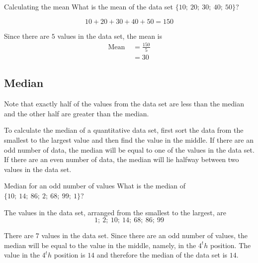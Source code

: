 \begin{wex}{Calculating the mean}{
    What is the mean of the data set $\{10;\ 20;\ 30;\ 40;\ 50\}$?
}{
  \begin{equation*}
    10 + 20 + 30 + 40 + 50 = 150
  \end{equation*}


  Since there are $5$ values in the data set, the mean is
  \begin{align*}
    \mbox{Mean }&=\frac{150}{5} \\
&= 30
  \end{align*}
}
\end{wex}

\subsection{Median}

Note that exactly half of the values from the data set are less than
  the median and the other half are greater than the median.\par

To calculate the median of a quantitative data set, first sort the
data from the smallest to the largest value and then find the value in
the middle. If there are an odd number of data, the median will be
equal to one of the values in the data set. If there are an even
number of data, the median will lie halfway between two values in
the data set.

\begin{wex}{Median for an odd number of values}{
  What is the median of $\{10;\ 14;\ 86;\ 2;\ 68;\ 99;\ 1\}$?
}{

  The values in the data set, arranged from the smallest to the largest, are
  \begin{equation*}
    1;\ 2;\ 10;\ 14;\ 68;\ 86;\ 99
  \end{equation*}


  There are $7$ values in the data set. Since there are an odd number
  of values, the median will be equal to the value in the middle,
  namely, in the $4^th$ position. The value in the $4^th$ position is
  $14$ and therefore the median of the data set is $14$.

}
\end{wex}

